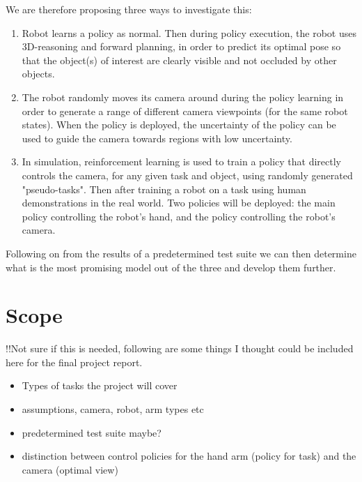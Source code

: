     We are therefore proposing three ways to investigate this:
    \begin{enumerate}
      \item Robot learns a policy as normal. Then during policy execution, the robot uses 3D-reasoning and forward planning, in order to predict its optimal pose so that the object(s) of interest are clearly visible and not occluded by other objects.
      \item The robot randomly moves its camera around during the policy learning in order to generate a range of different camera viewpoints (for the same robot states). When the policy is deployed, the uncertainty of the policy  can be used to guide the camera towards regions with low uncertainty.
      \item In simulation, reinforcement learning is used to train a policy that directly controls the camera, for any given task and object, using randomly generated "pseudo-tasks". Then after training a robot on a task using human demonstrations in the real world. Two policies will be deployed: the main policy controlling the robot's hand, and the policy controlling the robot's camera.
\end{enumerate}
Following on from the results of a predetermined test suite we can then determine what is the most promising model out of the three and develop them further.
\section{Scope}
!!Not sure if this is needed, following are some things I thought could be included here for the final project report.

\begin{itemize}
	\item Types of tasks the project will cover
	\item assumptions, camera, robot, arm types etc
	\item predetermined test suite maybe?
	\item distinction between control policies for the hand arm (policy for task) and the camera (optimal view)
\end{itemize}

